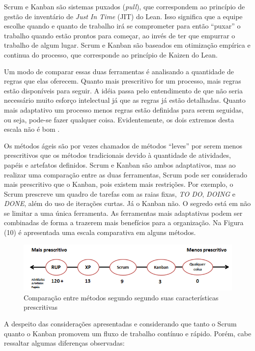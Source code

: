 Scrum e Kanban são sistemas puxados (\textit{pull}), que correspondem ao princípio de gestão de inventário de \textit{Just In Time} (JIT) do Lean. Isso significa que a equipe escolhe quando e quanto de trabalho irá se comprometer para então “puxar” o trabalho quando estão prontos para começar, ao invés de ter que empurrar o trabalho de algum lugar. Scrum e Kanban são baseados em otimização empírica e continua do processo, que corresponde ao princípio de Kaizen do Lean.

Um modo de comparar essas duas ferramentas é analisando a quantidade de regras que elas oferecem. Quanto mais prescritivo for um processo, mais regras estão disponíveis para seguir. A idéia passa pelo entendimento de que não seria necessário muito esforço intelectual já que as regras já estão detalhadas. Quanto mais adaptativo um processo menos regras estão definidas para serem seguidas, ou seja, pode-se fazer qualquer coisa. Evidentemente, os dois extremos desta escala não é bom   \cite{kniberg2009}. 

Os métodos ágeis são por vezes chamados de métodos “leves” por serem menos prescritivos que os métodos tradicionais devido à quantidade de atividades, papéis e artefatos definidos. Scrum e Kanban são ambos adaptativos, mas ao realizar uma comparação entre as duas ferramentas, Scrum pode ser considerado mais prescritivo que o Kanban, pois existem mais restrições. Por exemplo, o Scrum prescreve um quadro de tarefas com as raias fixas, \textit{TO DO}, \textit{DOING} e \textit{DONE}, além do uso de iterações curtas. Já o Kanban não. O segredo está em não se limitar a uma única ferramenta. As ferramentas mais adaptativas podem ser combinadas de forma a trazerem mais benefícios para a organização. Na Figura (10) é apresentada uma escala comparativa em alguns métodos.

\begin{figure}[H]
		\centering
		\label{fig02}
			\includegraphics[scale=0.7]{figuras/prescritivo.png}
		\caption{Comparação entre métodos segundo segundo suas características prescritivas \cite{kniberg2009}}
\end{figure}

A despeito das considerações apresentadas e considerando que tanto o Scrum quanto o Kanban promovem um fluxo de trabalho contínuo e rápido. Porém, cabe ressaltar algumas diferenças observadas:

